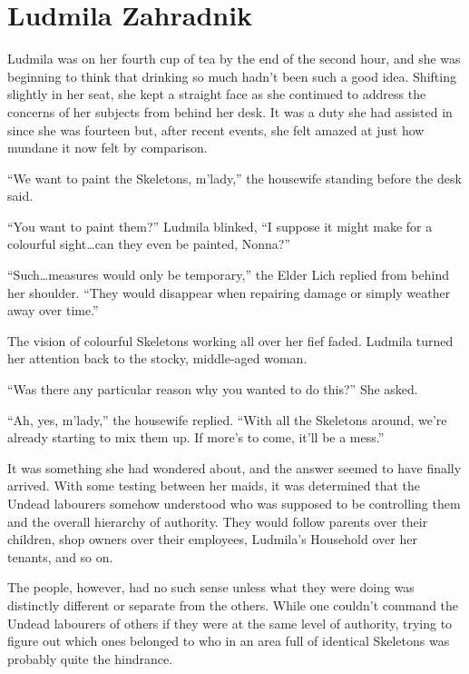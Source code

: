 \chapter{Ludmila Zahradnik}

Ludmila was on her fourth cup of tea by the end of the second hour, and she was beginning to think that drinking so much hadn’t been such a good idea. Shifting slightly in her seat, she kept a straight face as she continued to address the concerns of her subjects from behind her desk. It was a duty she had assisted in since she was fourteen but, after recent events, she felt amazed at just how mundane it now felt by comparison.

 

“We want to paint the Skeletons, m’lady,” the housewife standing before the desk said.

 

“You want to paint them?” Ludmila blinked, “I suppose it might make for a colourful sight…can they even be painted, Nonna?”

 

“Such…measures would only be temporary,” the Elder Lich replied from behind her shoulder. “They would disappear when repairing damage or simply weather away over time.”

 

The vision of colourful Skeletons working all over her fief faded. Ludmila turned her attention back to the stocky, middle-aged woman.

 

“Was there any particular reason why you wanted to do this?” She asked.

 

“Ah, yes, m’lady,” the housewife replied. “With all the Skeletons around, we’re already starting to mix them up. If more’s to come, it’ll be a mess.”

 

It was something she had wondered about, and the answer seemed to have finally arrived. With some testing between her maids, it was determined that the Undead labourers somehow understood who was supposed to be controlling them and the overall hierarchy of authority. They would follow parents over their children, shop owners over their employees, Ludmila’s Household over her tenants, and so on.

 

The people, however, had no such sense unless what they were doing was distinctly different or separate from the others. While one couldn’t command the Undead labourers of others if they were at the same level of authority, trying to figure out which ones belonged to who in an area full of identical Skeletons was probably quite the hindrance.

